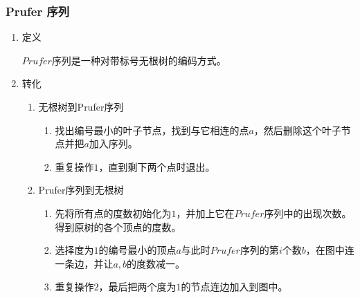 \documentclass[11pt]{article}
\begin{document}
\subsubsection{Prufer 序列}
\label{sec:org026b51f}
\begin{enumerate}
\item 定义
\label{sec:org7fe69e7}

\(Prufer\)序列是一种对带标号无根树的编码方式。

\item 转化
\label{sec:org535ca7b}

\begin{enumerate}
\item 无根树到Prufer序列
\label{sec:org7d77742}

\begin{enumerate}
\item 找出编号最小的叶子节点，找到与它相连的点\(a\)，然后删除这个叶子节点并把\(a\)加入序列。
\item 重复操作\(1\)，直到剩下两个点时退出。
\end{enumerate}

\item Prufer序列到无根树
\label{sec:org347baed}

\begin{enumerate}
\item 先将所有点的度数初始化为\(1\)，并加上它在\(Prufer\)序列中的出现次数。得到原树的各个顶点的度数。
\item 选择度为\(1\)的编号最小的顶点\(a\)与此时\(Prufer\)序列的第\(i\)个数\(b\)，在图中连一条边\(<a,b>\)，并让\(a,b\)的度数减一。
\item 重复操作\(2\)，最后把两个度为\(1\)的节点连边加入到图中。
\end{enumerate}
\end{enumerate}
\end{enumerate}
\end{document}
